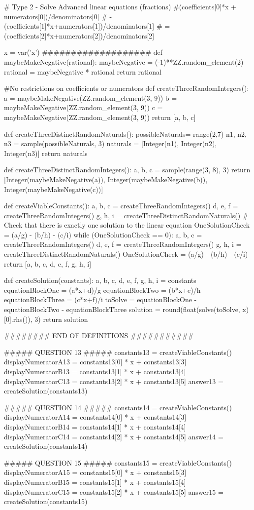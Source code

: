 \documentclass{ximera}
\begin{document}
\begin{sagesilent}
# Type 2 - Solve Advanced linear equations (fractions)
#(coefficients[0]*x + numerators[0])/denominators[0]
    # - (coefficients[1]*x+numerators[1])/denominators[1]
    # = (coefficients[2]*x+numerators[2])/denominators[2]

x = var('x')
###################
def maybeMakeNegative(rational):
    maybeNegative = (-1)**ZZ.random_element(2)
    rational = maybeNegative * rational
    return rational

#No restrictions on coefficients or numerators
def createThreeRandomIntegers():
    a = maybeMakeNegative(ZZ.random_element(3, 9))
    b = maybeMakeNegative(ZZ.random_element(3, 9))
    c = maybeMakeNegative(ZZ.random_element(3, 9))
    return [a, b, c]

def createThreeDistinctRandomNaturals():
    possibleNaturals= range(2,7)
    n1, n2, n3 = sample(possibleNaturals, 3)
    naturals = [Integer(n1), Integer(n2), Integer(n3)]
    return naturals

def createThreeDistinctRandomIntegers():
    a, b, c = sample(range(3, 8), 3)
    return [Integer(maybeMakeNegative(a)), Integer(maybeMakeNegative(b)), Integer(maybeMakeNegative(c))]

def createViableConstants():
    a, b, c = createThreeRandomIntegers()
    d, e, f = createThreeRandomIntegers()
    g, h, i = createThreeDistinctRandomNaturals()
    # Check that there is exactly one solution to the linear equation
    OneSolutionCheck = (a/g) - (b/h) - (c/i)
    while (OneSolutionCheck == 0):
        a, b, c = createThreeRandomIntegers()
        d, e, f = createThreeRandomIntegers()
        g, h, i = createThreeDistinctRandomNaturals()
        OneSolutionCheck = (a/g) - (b/h) - (c/i)
    return [a, b, c, d, e, f, g, h, i]

def createSolution(constants):
    a, b, c, d, e, f, g, h, i = constants
    equationBlockOne = (a*x+d)/g
    equationBlockTwo = (b*x+e)/h
    equationBlockThree = (c*x+f)/i
    toSolve = equationBlockOne - equationBlockTwo - equationBlockThree
    solution = round(float(solve(toSolve, x)[0].rhs()), 3)
    return solution

######## END OF DEFINITIONS ###########

##### QUESTION 13 #####
constants13 = createViableConstants()
displayNumeratorA13 = constants13[0] * x + constants13[3]
displayNumeratorB13 = constants13[1] * x + constants13[4]
displayNumeratorC13 = constants13[2] * x + constants13[5]
answer13 = createSolution(constants13)

##### QUESTION 14 #####
constants14 = createViableConstants()
displayNumeratorA14 = constants14[0] * x + constants14[3]
displayNumeratorB14 = constants14[1] * x + constants14[4]
displayNumeratorC14 = constants14[2] * x + constants14[5]
answer14 = createSolution(constants14)

##### QUESTION 15 #####
constants15 = createViableConstants()
displayNumeratorA15 = constants15[0] * x + constants15[3]
displayNumeratorB15 = constants15[1] * x + constants15[4]
displayNumeratorC15 = constants15[2] * x + constants15[5]
answer15 = createSolution(constants15)
\end{sagesilent}
\end{document}
